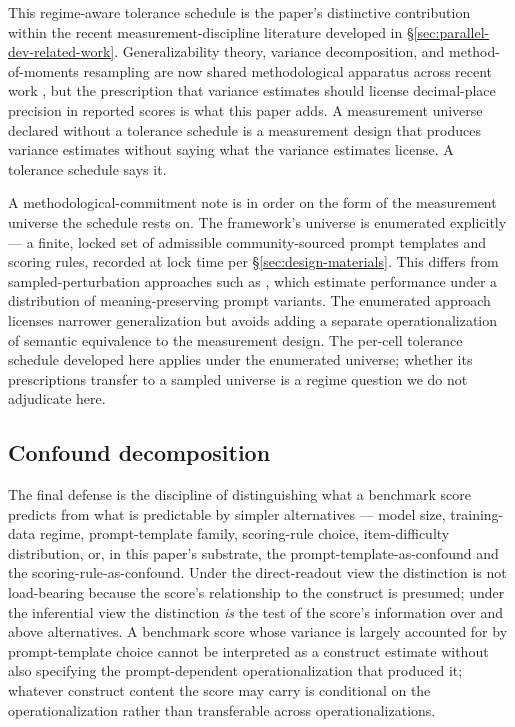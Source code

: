 \documentclass[11pt]{article}
\begin{document}
This regime-aware tolerance schedule is the paper's distinctive
contribution within the recent measurement-discipline literature
developed in §\ref{sec:parallel-dev-related-work}. Generalizability
theory, variance decomposition, and method-of-moments resampling are
now shared methodological apparatus across recent work
\citep{nist2026statmodels, camuffo2026variance, sui2025evaluating,
lior2025reliableeval}, but the prescription that variance estimates
should license decimal-place precision in reported scores is what
this paper adds. A measurement universe declared without a tolerance
schedule is a measurement design that produces variance estimates
without saying what the variance estimates license. A tolerance
schedule says it.

A methodological-commitment note is in order on the form of the
measurement universe the schedule rests on. The framework's
universe is enumerated explicitly --- a finite, locked set of
admissible community-sourced prompt templates and scoring rules,
recorded at lock time per §\ref{sec:design-materials}. This differs
from sampled-perturbation approaches such as
\citet{lior2025reliableeval}, which estimate performance under a
distribution of meaning-preserving prompt variants. The enumerated
approach licenses narrower generalization but avoids adding a
separate operationalization of semantic equivalence to the
measurement design. The per-cell tolerance schedule developed here
applies under the enumerated universe; whether its prescriptions
transfer to a sampled universe is a regime question we do not
adjudicate here.

\subsection{Confound decomposition}
\label{sec:confound-decomposition}


The final defense is the discipline of distinguishing what a
benchmark score predicts from what is predictable by simpler
alternatives --- model size, training-data regime, prompt-template
family, scoring-rule choice, item-difficulty distribution, or, in
this paper's substrate, the prompt-template-as-confound and the
scoring-rule-as-confound. Under the direct-readout view the
distinction is not load-bearing because the score's relationship to
the construct is presumed; under the inferential view the
distinction \emph{is} the test of the score's information over and
above alternatives. A benchmark score whose variance is largely
accounted for by prompt-template choice cannot be interpreted as a
construct estimate without also specifying the prompt-dependent
operationalization that produced it; whatever construct content the
score may carry is conditional on the operationalization rather
than transferable across operationalizations.
\end{document}
